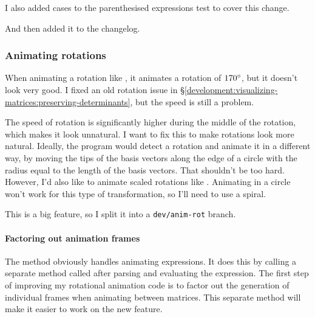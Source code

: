 \documentclass[../development.tex]{subfiles}
\begin{document}

I also added cases to the parenthesised expressions test to cover this change.


And then added it to the changelog.


\subsubsection{Animating rotations\label{development:making-v0.2.2:animating-rotations}}

When animating a rotation like , it animates a rotation of $170\degree$, but it doesn't look very good. I fixed an old rotation issue in \S\ref{development:visualizing-matrices:preserving-determinants}, but the speed is still a problem.

The speed of rotation is significantly higher during the middle of the rotation, which makes it look unnatural. I want to fix this to make rotations look more natural. Ideally, the program would detect a rotation and animate it in a different way, by moving the tips of the basis vectors along the edge of a circle with the radius equal to the length of the basis vectors. That shouldn't be too hard. However, I'd also like to animate scaled rotations like . Animating in a circle won't work for this type of transformation, so I'll need to use a spiral.

This is a big feature, so I split it into a \texttt{dev/anim-rot} branch.

\paragraph{Factoring out animation frames\label{development:making-v0.2.2:animating-rotations:factoring-out-animation-frames}}

The  method obviously handles animating expressions. It does this by calling a separate method called  after parsing and evaluating the expression. The first step of improving my rotational animation code is to factor out the generation of individual frames when animating between matrices. This separate method will make it easier to work on the new feature.
\end{document}
